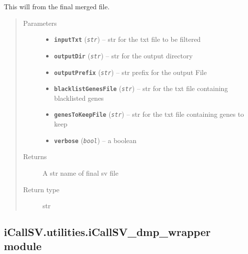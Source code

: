 \documentclass[letterpaper,10pt,english]{sphinxmanual}
\begin{document}
\begin{fulllineitems}
\label{iCallSV:iCallSV.filterAnnotatedSV.run}
This will  from the final merged file.
\begin{quote}\begin{description}
\item[{Parameters}] \leavevmode\begin{itemize}
\item {} 
\textbf{\texttt{inputTxt}} (\emph{\texttt{str}}) -- str for the txt file to be filtered

\item {} 
\textbf{\texttt{outputDir}} (\emph{\texttt{str}}) -- str for the output directory

\item {} 
\textbf{\texttt{outputPrefix}} (\emph{\texttt{str}}) -- str prefix for the output File

\item {} 
\textbf{\texttt{blacklistGenesFile}} (\emph{\texttt{str}}) -- str for the txt file containing blacklisted genes

\item {} 
\textbf{\texttt{genesToKeepFile}} (\emph{\texttt{str}}) -- str for the txt file containing genes to keep

\item {} 
\textbf{\texttt{verbose}} (\emph{\texttt{bool}}) -- a boolean

\end{itemize}

\item[{Returns}] \leavevmode
A str name of final sv file

\item[{Return type}] \leavevmode
str

\end{description}\end{quote}

\end{fulllineitems}



\subsection{iCallSV.utilities.iCallSV\_dmp\_wrapper module}
\label{iCallSV:icallsv-utilities-icallsv-dmp-wrapper-module}
\end{document}
